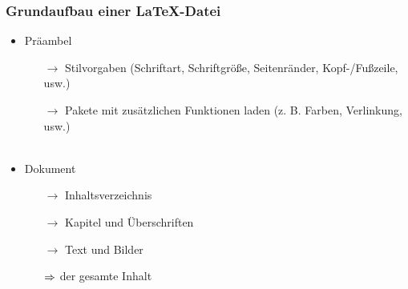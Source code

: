 \begin{frame}
	\frametitle{Grundaufbau einer \LaTeX-Datei}
	
	\begin{itemize}
		\item Präambel
			\begin{itemize}
				\item[$\to$] Stilvorgaben (Schriftart, Schriftgröße, Seitenränder, Kopf-/Fußzeile, usw.)
				\item[$\to$] Pakete mit zusätzlichen Funktionen laden (z. B. Farben, Verlinkung, usw.)\\~
			\end{itemize}
		\item Dokument
			\begin{itemize}
				\item[$\to$] Inhaltsverzeichnis
				\item[$\to$] Kapitel und Überschriften
				\item[$\to$] Text und Bilder
				\item[$\Rightarrow$] der gesamte Inhalt
			\end{itemize}
	\end{itemize}
\end{frame}

